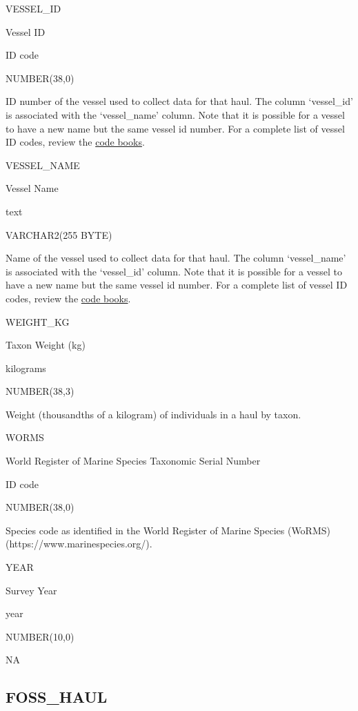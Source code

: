\documentclass[
  letterpaper,
  oneside,
  open=any]{scrbook}
\begin{document}
VESSEL\_ID

Vessel ID

ID code

NUMBER(38,0)

ID number of the vessel used to collect data for that haul. The column
`vessel\_id' is associated with the `vessel\_name' column. Note that it
is possible for a vessel to have a new name but the same vessel id
number. For a complete list of vessel ID codes, review the
\href{https://www.fisheries.noaa.gov/resource/document/groundfish-survey-species-code-manual-and-data-codes-manual}{code
books}.

VESSEL\_NAME

Vessel Name

text

VARCHAR2(255 BYTE)

Name of the vessel used to collect data for that haul. The column
`vessel\_name' is associated with the `vessel\_id' column. Note that it
is possible for a vessel to have a new name but the same vessel id
number. For a complete list of vessel ID codes, review the
\href{https://www.fisheries.noaa.gov/resource/document/groundfish-survey-species-code-manual-and-data-codes-manual}{code
books}.

WEIGHT\_KG

Taxon Weight (kg)

kilograms

NUMBER(38,3)

Weight (thousandths of a kilogram) of individuals in a haul by taxon.

WORMS

World Register of Marine Species Taxonomic Serial Number

ID code

NUMBER(38,0)

Species code as identified in the World Register of Marine Species
(WoRMS) (https://www.marinespecies.org/).

YEAR

Survey Year

year

NUMBER(10,0)

NA

\hypertarget{foss_haul}{%
\subsection{FOSS\_HAUL}\label{foss_haul}}
\end{document}
